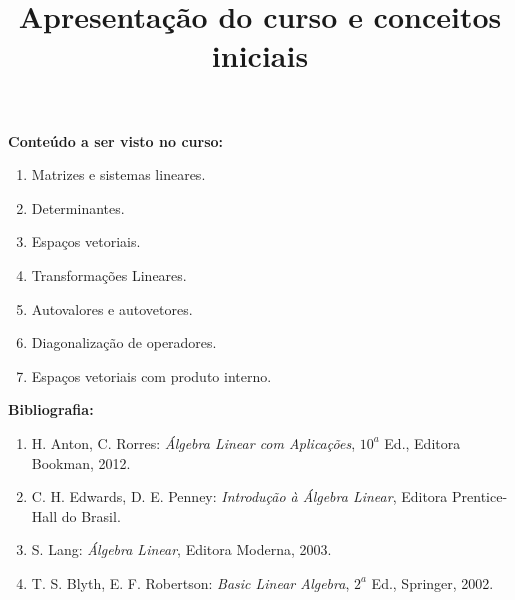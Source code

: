 \documentclass{beamer}
\title{Apresentação do curso e conceitos iniciais}
\author[\autor]{\autor}
\institute[\instituto]{\instituto}
\date{}
\begin{document}
    \begin{frame}
        \maketitle
    \end{frame}


    \begin{frame}
        {\bf Conteúdo a ser visto no curso:}
        \begin{enumerate}[label={\roman*})]
            \item Matrizes e sistemas lineares.\pause

            \item Determinantes.\pause

            \item Espaços vetoriais.\pause

            \item Transformações Lineares.\pause

            \item Autovalores e autovetores.\pause

            \item Diagonalização de operadores.\pause

            \item Espaços vetoriais com produto interno.\pause
        \end{enumerate}
    \end{frame}

    \begin{frame}
        {\bf Bibliografia:}
        \begin{enumerate}[label={\arabic*})]
            \item H. Anton, C. Rorres: {\it {\'A}lgebra Linear com Aplicações}, $10^a$ Ed., Editora Bookman, 2012.\pause

        \item C. H. Edwards, D. E. Penney: {\it Introdução à Álgebra Linear}, Editora Prentice-Hall do Brasil.\pause

            \item S. Lang: {\it Álgebra Linear}, Editora Moderna, 2003.\pause

            \item T. S. Blyth, E. F. Robertson: {\it Basic Linear Algebra}, $2^a$ Ed., Springer, 2002.\pause
        \end{enumerate}
    \end{frame}
\end{document}
